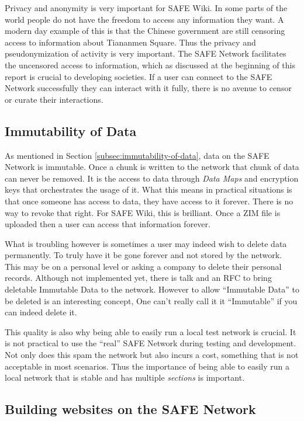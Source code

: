 Privacy and anonymity is very important for SAFE Wiki. In some parts of the world people do not have the freedom to access any information they want. A modern day example of this is that the Chinese government are still censoring access to information about Tiananmen Square\cite{tiananmen-square}. Thus the privacy and pseudonymization of activity is very important. The SAFE Network facilitates the uncensored access to information, which as discussed at the beginning of this report is crucial to developing societies. If a user can connect to the SAFE Network successfully they can interact with it fully, there is no avenue to censor or curate their interactions.

\subsection{Immutability of Data}

As mentioned in Section \ref{subsec:immutability-of-data}, data on the SAFE Network is immutable. Once a chunk is written to the network that chunk of data can never be removed. It is the access to data through \textit{Data Maps} and encryption keys that orchestrates the usage of it. What this means in practical situations is that once someone has access to data, they have access to it forever. There is no way to revoke that right. For SAFE Wiki, this is brilliant. Once a ZIM file is uploaded then a user can access that information forever.

What is troubling however is sometimes a user may indeed wish to delete data permanently. To truly have it be gone forever and not stored by the network. This may be on a personal level or asking a company to delete their personal records. Although not implemented yet, there is talk and an RFC\cite{delete-data-rfc} to bring deletable Immutable Data to the network. However to allow ``Immutable Data'' to be deleted is an interesting concept, One can't really call it it ``Immutable'' if you can indeed delete it.

This quality is also why being able to easily run a local test network is crucial. It is not practical to use the ``real'' SAFE Network during testing and development. Not only does this spam the network but also incurs a cost, something that is not acceptable in most scenarios. Thus the importance of being able to easily run a local network that is stable and has multiple \textit{sections} is important.

\subsection{Building websites on the SAFE Network}

